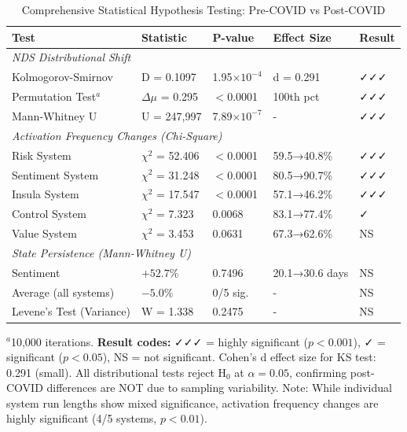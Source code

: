 
\begin{table}[htbp]
\centering
\caption{Comprehensive Statistical Hypothesis Testing: Pre-COVID vs Post-COVID}
\label{tab:statistical_tests}
\small
\begin{tabular}{@{}lllll@{}}
\toprule
\textbf{Test} & \textbf{Statistic} & \textbf{P-value} & \textbf{Effect Size} & \textbf{Result} \\
\midrule
\multicolumn{5}{l}{\textit{NDS Distributional Shift}} \\
Kolmogorov-Smirnov & D = 0.1097 & 1.95$\times10^{-4}$ & d = 0.291 & ✓✓✓ \\
Permutation Test$^a$ & $\Delta\mu$ = 0.295 & $<$0.0001 & 100th pct & ✓✓✓ \\
Mann-Whitney U & U = 247,997 & 7.89$\times10^{-7}$ & - & ✓✓✓ \\
\midrule
\multicolumn{5}{l}{\textit{Activation Frequency Changes (Chi-Square)}} \\
\quad Risk System & $\chi^2$ = 52.406 & $<$0.0001 & 59.5→40.8\% & ✓✓✓ \\
\quad Sentiment System & $\chi^2$ = 31.248 & $<$0.0001 & 80.5→90.7\% & ✓✓✓ \\
\quad Insula System & $\chi^2$ = 17.547 & $<$0.0001 & 57.1→46.2\% & ✓✓✓ \\
\quad Control System & $\chi^2$ = 7.323 & 0.0068 & 83.1→77.4\% & ✓ \\
\quad Value System & $\chi^2$ = 3.453 & 0.0631 & 67.3→62.6\% & NS \\
\midrule
\multicolumn{5}{l}{\textit{State Persistence (Mann-Whitney U)}} \\
\quad Sentiment & $+52.7\%$ & 0.7496 & 20.1→30.6 days & NS \\
\quad Average (all systems) & $-5.0\%$ & 0/5 sig. & - & NS \\
\midrule
Levene's Test (Variance) & W = 1.338 & 0.2475 & - & NS \\
\bottomrule
\end{tabular}
\vspace{0.5em}
\begin{flushleft}
\footnotesize
$^a$10,000 iterations. \textbf{Result codes:} ✓✓✓ = highly significant ($p < 0.001$), 
✓ = significant ($p < 0.05$), NS = not significant. Cohen's d effect size for KS test: 
0.291 (small). All distributional tests reject H$_0$ at $\alpha = 0.05$, confirming 
post-COVID differences are NOT due to sampling variability. Note: While individual 
system run lengths show mixed significance, activation frequency changes are highly 
significant (4/5 systems, $p < 0.01$).
\end{flushleft}
\end{table}


